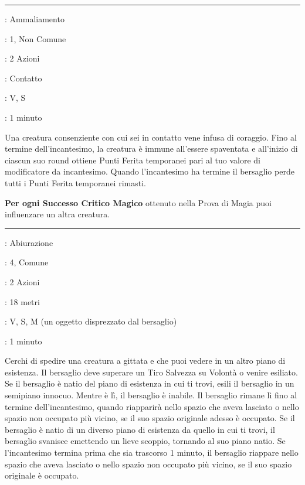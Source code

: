 \begin{multicols}{2}
\smallskip\noindent\rule{\linewidth}{2pt} \hypertarget{Eroismo}{}\medskip{}
\noindent
\begin{description}[noitemsep, topsep=0pt, parsep=0pt, partopsep=0pt, leftmargin=0cm, labelwidth=2.8cm]
	\item[\textbf{Lista di Magia}]: Ammaliamento
	\item[\textbf{Livello}]: 1, Non Comune
	\item[\textbf{T. di Lancio}]: 2 Azioni
	\item[\textbf{Gittata}]: Contatto
	\item[\textbf{Componenti}]: V, S
	\item[\textbf{Durata}]: 1 minuto
\end{description}

Una creatura consenziente con cui sei in contatto vene infusa di coraggio. Fino al termine dell'incantesimo, la creatura è immune all'essere spaventata e all'inizio di ciascun suo round ottiene Punti Ferita temporanei pari al tuo valore di modificatore da incantesimo. Quando l'incantesimo ha termine il bersaglio perde tutti i Punti Ferita temporanei rimasti.

\textbf{Per ogni Successo Critico Magico} ottenuto nella Prova di Magia puoi influenzare un altra creatura.

\smallskip\noindent\rule{\linewidth}{2pt} \hypertarget{Esilio}{}\medskip{}
\noindent
\begin{description}[noitemsep, topsep=0pt, parsep=0pt, partopsep=0pt, leftmargin=0cm, labelwidth=2.8cm]
	\item[\textbf{Lista di Magia}]: Abiurazione
	\item[\textbf{Livello}]: 4, Comune
	\item[\textbf{T. di Lancio}]: 2 Azioni
	\item[\textbf{Gittata}]: 18 metri
	\item[\textbf{Componenti}]: V, S, M (un oggetto disprezzato dal bersaglio)
	\item[\textbf{Durata}]: 1 minuto
\end{description}

Cerchi di spedire una creatura a gittata e che puoi vedere in un altro piano di esistenza. Il bersaglio deve superare un Tiro Salvezza su Volontà o venire esiliato. Se il bersaglio è natio del piano di esistenza in cui ti trovi, esili il bersaglio in un semipiano innocuo. Mentre è lì, il bersaglio è inabile. Il bersaglio rimane lì fino al termine dell'incantesimo, quando riapparirà nello spazio che aveva lasciato o nello spazio non occupato più vicino, se il suo spazio originale adesso è occupato. Se il bersaglio è natio di un diverso piano di esistenza da quello in cui ti trovi, il bersaglio svanisce emettendo un lieve scoppio, tornando al suo piano natio. Se l'incantesimo termina prima che sia trascorso 1 minuto, il bersaglio riappare nello spazio che aveva lasciato o nello spazio non occupato più vicino, se il suo spazio originale è occupato.


\end{multicols}
